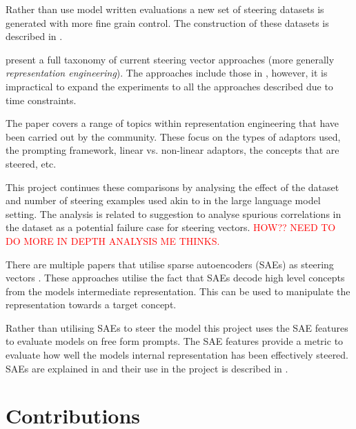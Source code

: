 Rather than use model written evaluations \cite{mwe} a new set of steering datasets is generated with more fine grain control.
The construction of these datasets is described in .

present a full taxonomy of current steering vector approaches (more generally \emph{representation engineering}).
The approaches include those in \citet{steering-clear}, however, it is impractical to expand the experiments to all the approaches described due to time constraints.

The paper covers a range of topics within representation engineering that have been carried out by the community.
These focus on the types of adaptors used, the prompting framework, linear vs. non-linear adaptors, the concepts that are steered, etc.

This project continues these comparisons by analysing the effect of the dataset and number of steering examples used akin to \citet{steering-clear} in the large language model setting.
The analysis is related to \cites{steering-taxonomy} suggestion to analyse spurious correlations in the dataset as a potential failure case for steering vectors.
\textcolor{red}{HOW?? NEED TO DO MORE IN DEPTH ANALYSIS ME THINKS.}

There are multiple papers that utilise sparse autoencoders (SAEs) as steering vectors \cite{sae-improved, sae-steering, icl-sae}.
These approaches utilise the fact that SAEs decode high level concepts from the models intermediate representation.
This can be used to manipulate the representation towards a target concept.

Rather than utilising SAEs to steer the model this project uses the SAE features to evaluate models on free form prompts.
The SAE features provide a metric to evaluate how well the models internal representation has been effectively steered.
SAEs are explained in  and their use in the project is described in .

\section{Contributions}
